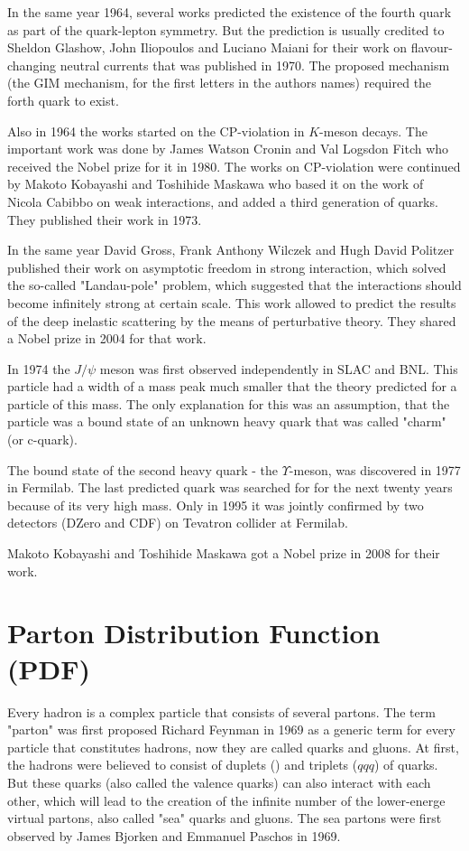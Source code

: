 In the same year 1964, several works predicted the existence of the fourth quark as part of the quark-lepton symmetry. But the prediction is usually credited to Sheldon Glashow, John Iliopoulos and Luciano Maiani for their work on flavour-changing neutral currents that was published in 1970. The proposed mechanism (the GIM mechanism, for the first letters in the authors names) required the forth quark to exist.

Also in 1964 the works started on the CP-violation in $K$-meson decays. The important work was done by James Watson Cronin and Val Logsdon Fitch who received the Nobel prize for it in 1980. The works on CP-violation were continued by Makoto Kobayashi and Toshihide Maskawa who based it on the work of Nicola Cabibbo on weak interactions, and added a third generation of quarks. They published their work in 1973.

In the same year David Gross, Frank Anthony Wilczek and Hugh David Politzer published their work on asymptotic freedom in strong interaction, which solved the so-called "Landau-pole" problem, which suggested that the interactions should become infinitely strong at certain scale. This work allowed to predict the results of the deep inelastic scattering by the means of perturbative theory. They shared a Nobel prize in 2004 for that work.

In 1974 the $J/\psi$ meson was first observed independently in SLAC and BNL. This particle had a width of a mass peak much smaller that the theory predicted for a particle of this mass. The only explanation for this was an assumption, that the particle was a bound state of an unknown heavy quark that was called "charm" (or c-quark).

The bound state of the second heavy quark - the $\Upsilon$-meson, was discovered in 1977 in Fermilab. The last predicted quark was searched for for the next twenty years because of its very high mass. Only in 1995 it was jointly confirmed by two detectors (DZero and CDF) on Tevatron collider at Fermilab.

Makoto Kobayashi and Toshihide Maskawa got a Nobel prize in 2008 for their work.

\section{Parton Distribution Function (PDF)}

Every hadron is a complex particle that consists of several partons. The term "parton" was first proposed Richard Feynman in 1969 as a generic term for every particle that constitutes hadrons, now they are called quarks and gluons. At first, the hadrons were believed to consist of duplets () and triplets ($qqq$) of quarks. But these quarks (also called the valence quarks) can also interact with each other, which will lead to the creation of the infinite number of the lower-energe virtual partons, also called "sea" quarks and gluons. The sea partons were first observed by James Bjorken and Emmanuel  Paschos in 1969.

